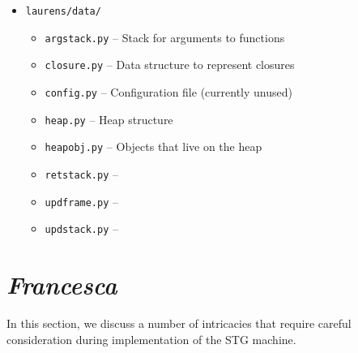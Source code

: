 \documentclass[preprint]{sigplanconf}
\begin{document}
\begin{itemize}
\begin{itemize}
\begin{itemize}
    \end{itemize}
  \item \lstinline{laurens/data/}
    \begin{itemize}
      \item \lstinline{argstack.py} -- Stack for arguments to functions
      \item \lstinline{closure.py}  -- Data structure to represent closures
      \item \lstinline{config.py}   -- Configuration file (currently unused)
      \item \lstinline{heap.py}     -- Heap structure
      \item \lstinline{heapobj.py}  -- Objects that live on the heap
      \item \lstinline{retstack.py} --
      \item \lstinline{updframe.py} --
      \item \lstinline{updstack.py} -- 
    \end{itemize}
  \end{itemize}
\end{itemize}


\section{\emph{Francesca}} %

In this section, we discuss a number of intricacies that require careful
consideration during implementation of the STG machine.
\end{document}

